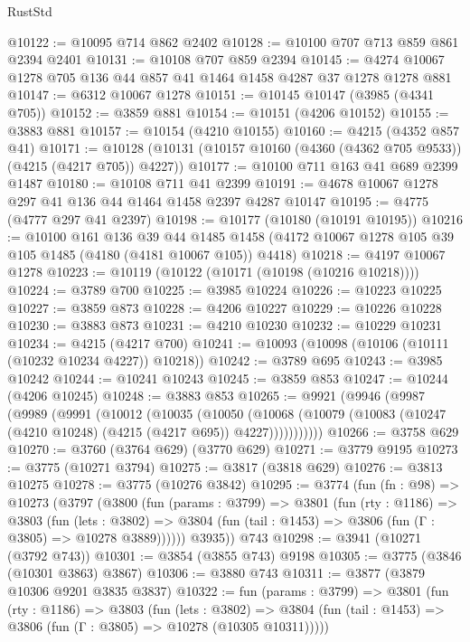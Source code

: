 \begin{lexlean}{RustStd}
\begin{coremodule}
{\begin{coremodule}
{{{{{{{{{{{{{{{{{{{{{{{{{{{{{{{@10122 := @10095 @714 @862 @2402
@10128 := @10100 @707 @713 @859 @861 @2394 @2401
@10131 := @10108 @707 @859 @2394
@10145 := @4274 @10067 @1278 @705 @136 @44 @857 @41 @1464 @1458 @4287 @37 @1278 @1278 @881
@10147 := @6312 @10067 @1278
@10151 := @10145 @10147 (@3985 (@4341 @705))
@10152 := @3859 @881
@10154 := @10151 (@4206 @10152)
@10155 := @3883 @881
@10157 := @10154 (@4210 @10155)
@10160 := @4215 (@4352 @857 @41)
@10171 := @10128 (@10131 (@10157 @10160 (@4360 (@4362 @705 @9533)) (@4215 (@4217 @705)) @4227))
@10177 := @10100 @711 @163 @41 @689 @2399 @1487
@10180 := @10108 @711 @41 @2399
@10191 := @4678 @10067 @1278 @297 @41 @136 @44 @1464 @1458 @2397 @4287 @10147
@10195 := @4775 (@4777 @297 @41 @2397)
@10198 := @10177 (@10180 (@10191 @10195))
@10216 := @10100
    @161
    @136
    @39
    @44
    @1485
    @1458
    (@4172 @10067 @1278 @105 @39 @105 @1485 (@4180 (@4181 @10067 @105)) @4418)
@10218 := @4197 @10067 @1278
@10223 := @10119 (@10122 (@10171 (@10198 (@10216 @10218))))
@10224 := @3789 @700
@10225 := @3985 @10224
@10226 := @10223 @10225
@10227 := @3859 @873
@10228 := @4206 @10227
@10229 := @10226 @10228
@10230 := @3883 @873
@10231 := @4210 @10230
@10232 := @10229 @10231
@10234 := @4215 (@4217 @700)
@10241 := @10093 (@10098 (@10106 (@10111 (@10232 @10234 @4227)) @10218))
@10242 := @3789 @695
@10243 := @3985 @10242
@10244 := @10241 @10243
@10245 := @3859 @853
@10247 := @10244 (@4206 @10245)
@10248 := @3883 @853
@10265 := @9921
    (@9946
      (@9987
        (@9989
          (@9991
            (@10012
              (@10035
                (@10050
                  (@10068
                    (@10079 (@10083 (@10247 (@4210 @10248) (@4215 (@4217 @695)) @4227)))))))))))
@10266 := @3758 @629
@10270 := @3760 (@3764 @629) (@3770 @629)
@10271 := @3779 @9195
@10273 := @3775 (@10271 @3794)
@10275 := @3817 (@3818 @629)
@10276 := @3813 @10275
@10278 := @3775 (@10276 @3842)
@10295 := @3774
    (fun (fn : @98) =>
    @10273
      (@3797
        (@3800
          (fun (params : @3799) =>
          @3801
            (fun (rty : @1186) =>
            @3803
              (fun (lets : @3802) =>
              @3804 (fun (tail : @1453) => @3806 (fun (Γ : @3805) => @10278 @3889))))))
        @3935))
    @743
@10298 := @3941 (@10271 (@3792 @743))
@10301 := @3854 (@3855 @743) @9198
@10305 := @3775 (@3846 (@10301 @3863) @3867)
@10306 := @3880 @743
@10311 := @3877 (@3879 @10306 @9201 @3835 @3837)
@10322 := fun (params : @3799) =>
  @3801
    (fun (rty : @1186) =>
    @3803
      (fun (lets : @3802) =>
      @3804 (fun (tail : @1453) => @3806 (fun (Γ : @3805) => @10278 (@10305 @10311)))))
}}}}}}}}}}}}}}}}}}}}}}}}}}}}}}}
\end{coremodule}}
\end{coremodule}
\end{lexlean}
